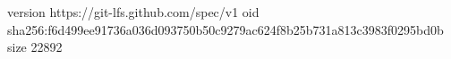version https://git-lfs.github.com/spec/v1
oid sha256:f6d499ee91736a036d093750b50c9279ac624f8b25b731a813c3983f0295bd0b
size 22892

